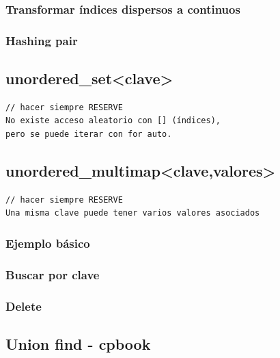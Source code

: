 \subsubsection{Transformar índices dispersos a continuos}
\raggedbottom
\subsubsection{Hashing pair}
\raggedbottom
\hrulefill
\subsection{unordered\_set\textless clave\textgreater}
\begin{verbatim}
// hacer siempre RESERVE
No existe acceso aleatorio con [] (índices),
pero se puede iterar con for auto.
\end{verbatim}
\raggedbottom
\hrulefill

\subsection{unordered\_multimap\textless clave,valores\textgreater}
\begin{verbatim}
// hacer siempre RESERVE
Una misma clave puede tener varios valores asociados
\end{verbatim}
\subsubsection{Ejemplo básico}
\raggedbottom
\subsubsection{Buscar por clave}
\raggedbottom
\subsubsection{Delete}
\raggedbottom
\hrulefill

\subsection{Union find - cpbook}
